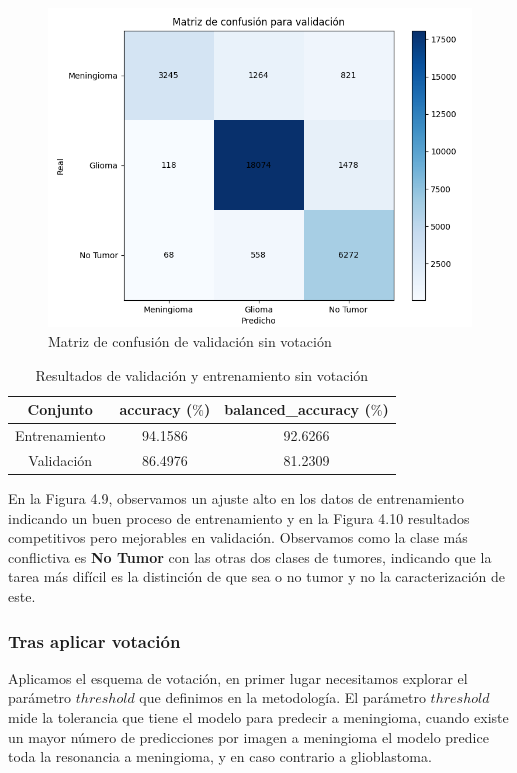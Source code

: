 \begin{figure}[H]
	\centering
	\includegraphics[width=0.7\linewidth]{imagenes/task1_results_validation.png}
	\caption{Matriz de confusión de validación sin votación}
\end{figure}

\begin{table}[H]
	\centering
	\begin{tabular}{|ccc|}
		\toprule
		Conjunto & accuracy ($\%$) & balanced\_accuracy ($\%$) \\
		\midrule
		Entrenamiento & 94.1586 & 92.6266 \\ 
		Validación & 86.4976 & 81.2309 \\ 
		\bottomrule
	\end{tabular}
	\caption{Resultados de validación y entrenamiento sin votación}
	\label{tabla:resultados10}
\end{table}

En la Figura 4.9, observamos un ajuste alto en los datos de entrenamiento indicando un buen proceso de entrenamiento y en la Figura 4.10 resultados competitivos pero mejorables en validación. Observamos como la clase más conflictiva es \textbf{No Tumor} con las otras dos clases de tumores, indicando que la tarea más difícil es la distinción de que sea o no tumor y no la caracterización de este.

\subsubsection{Tras aplicar votación}

Aplicamos el esquema de votación, en primer lugar necesitamos explorar el parámetro $threshold$ que definimos en la metodología. El parámetro $threshold$ mide la tolerancia que tiene el modelo para predecir a meningioma, cuando existe un mayor número de predicciones por imagen a meningioma el modelo predice toda la resonancia a meningioma, y en caso contrario a glioblastoma.

